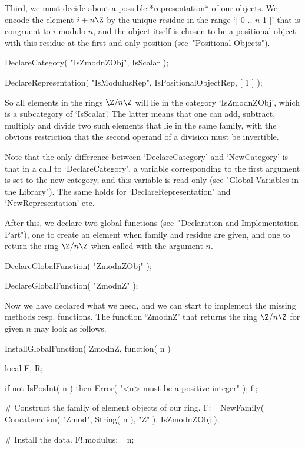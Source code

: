 Third, we must decide about a possible *representation* of our objects.
We encode the element $i + n\Z$ by the unique residue in the range
`[ 0 .. $n$-1 ]' that is congruent to $i$ modulo $n$,
and the object itself is chosen to be a positional object with this
residue at the first and only position (see~"Positional Objects").

\begintt
    DeclareCategory( "IsZmodnZObj", IsScalar );

    DeclareRepresentation( "IsModulusRep",
        IsPositionalObjectRep,
        [ 1 ] );
\endtt

So all elements in the rings $\Z/n\Z$ will lie in the category
`IsZmodnZObj',
which is a subcategory of `IsScalar'.
The latter means that one can add, subtract, multiply and divide
two such elements that lie in the same family,
with the obvious restriction that the second operand of a division
must be invertible.

Note that the only difference between `DeclareCategory' and `NewCategory' 
is that in a call to `DeclareCategory', a variable corresponding to the
first argument is set to the new category, and this variable is read-only
(see "Global Variables in the Library").
The same holds for `DeclareRepresentation' and `NewRepresentation' etc.

After this, we declare two global functions
(see~"Declaration and Implementation Part"),
one to create an element when family and residue are given,
and one to return the ring $\Z/n\Z$ when called with the argument $n$.

\begintt
    DeclareGlobalFunction( "ZmodnZObj" );

    DeclareGlobalFunction( "ZmodnZ" );
\endtt

Now we have declared what we need,
and we can start to implement the missing methods resp. functions.
The function `ZmodnZ' that returns the ring $\Z/n\Z$ for given $n$
may look as follows.

\begintt
    InstallGlobalFunction( ZmodnZ, function( n )

        local F, R;

        if not IsPosInt( n ) then
          Error( "<n> must be a positive integer" );
        fi;

        # Construct the family of element objects of our ring.
        F:= NewFamily( Concatenation( "Zmod", String( n ), "Z" ),
                       IsZmodnZObj );

        # Install the data.
        F!.modulus:= n;

